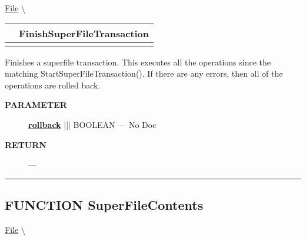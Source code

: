 \hypertarget{ecldoc:file.finishsuperfiletransaction}{}
\hspace{0pt} \hyperlink{ecldoc:File}{File} \textbackslash 

{\renewcommand{\arraystretch}{1.5}
\begin{tabularx}{\textwidth}{|>{\raggedright\arraybackslash}l|X|}
\hline
\hspace{0pt}\mytexttt{\color{red} } & \textbf{FinishSuperFileTransaction} \\
\hline
\multicolumn{2}{|>{\raggedright\arraybackslash}X|}{\hspace{0pt}\mytexttt{\color{param} (boolean rollback=FALSE)}} \\
\hline
\end{tabularx}
}

\par





Finishes a superfile transaction. This executes all the operations since the matching StartSuperFileTransaction(). If there are any errors, then all of the operations are rolled back.






\par
\begin{description}
\item [\colorbox{tagtype}{\color{white} \textbf{\textsf{PARAMETER}}}] \textbf{\underline{rollback}} ||| BOOLEAN --- No Doc
\end{description}







\par
\begin{description}
\item [\colorbox{tagtype}{\color{white} \textbf{\textsf{RETURN}}}] \textbf{} --- 
\end{description}




\rule{\linewidth}{0.5pt}
\subsection*{\textsf{\colorbox{headtoc}{\color{white} FUNCTION}
SuperFileContents}}

\hypertarget{ecldoc:file.superfilecontents}{}
\hspace{0pt} \hyperlink{ecldoc:File}{File} \textbackslash 

